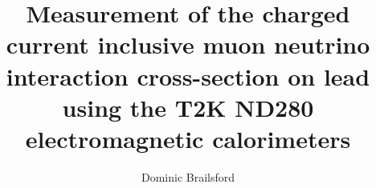 \documentclass[hyperpdf,bindnopdf, oneside]{hepthesis}
\title{Measurement of the charged current inclusive muon neutrino interaction cross-section on lead using the T2K ND280 electromagnetic calorimeters}
\author{Dominic Brailsford}
\begin{document}
\begin{frontmatter}
  
\end{frontmatter}

\begin{mainmatter}

\setcounter{secnumdepth}{5}
  
  
  
  
  
  
  
  
  

\end{mainmatter}

%  

\begin{backmatter}
  
\end{backmatter}

\end{document}
